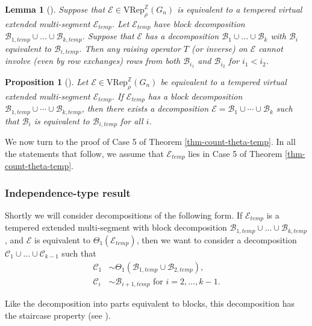 \documentclass[11pt,letterpaper]{amsart}
\newcommand{\VRep}{{\mathrm{VRep}}}
\newcommand{\BB}{\mathcal{B}}
\newcommand{\CC}{\mathcal{C}}
\newcommand{\EE}{\mathcal{E}}
\newtheorem{lemma}[thm]{Lemma}
\newtheorem{prop}[thm]{Proposition}
\numberwithin{equation}{section}
\begin{document}
\begin{lemma}[{\cite[Lemma 7.12]{HKT26}}]
\label{lem-independence-of-blocks} 
    Suppose that $\EE\in\VRep_\rho^\mathbb{Z}(G_n)$ is equivalent to a tempered virtual extended multi-segment $\EE_{temp}$. Let $\EE_{temp}$ have block decomposition $\BB_{1, temp} \cup \dots \cup \BB_{k, temp}$. Suppose that $\EE$ has a decomposition $\BB_1 \cup \dots \cup \BB_k$ with $\BB_i$ equivalent to $\BB_{i, temp}$. Then any raising operator $T$ (or inverse) on $\EE$ cannot involve (even by row exchanges) rows from both $\BB_{i_1}$ and $\BB_{i_2}$ for $i_1 < i_2$.
\end{lemma}

\begin{prop}[{\cite[Proposition 7.13]{HKT26}}]
\label{prop-independence-of-blocks} 
    Let $\EE\in\VRep_\rho^\mathbb{Z}(G_n)$ be  equivalent to a tempered virtual extended multi-segment $\EE_{temp}$. If $\EE_{temp}$ has a block decomposition $\BB_{1, temp} \cup \cdots \cup \BB_{k, temp}$, then there exists a decomposition $\EE = \BB_1 \cup \cdots \cup \BB_k$ such that $\BB_i$ is equivalent to $\BB_{i, temp}$ for all $i$.
\end{prop}


We now turn to the proof of Case 5 of Theorem \ref{thm-count-theta-temp}. In all the statements that follow, we assume that $\EE_{temp}$ lies in Case 5 of Theorem \ref{thm-count-theta-temp}.


\subsubsection{Independence-type result}

Shortly we will consider decompositions of the following form. If $\EE_{temp}$ is a tempered extended multi-segment with block decomposition $\BB_{1, temp} \cup \dots \cup \BB_{k, temp}$, and $\EE$ is equivalent to $\Theta_1(\EE_{temp})$, then we want to consider a decomposition $\CC_1 \cup \dots \cup \CC_{k-1}$ such that
\begin{align*}
    \CC_1 &\sim \Theta_1(\BB_{1, temp} \cup \BB_{2, temp}), \\
    \CC_i &\sim \BB_{i+1, temp} \text{ for } i = 2, \dots, k-1.
\end{align*}

Like the decomposition into parts equivalent to blocks, this decomposition has the staircase property (see \cite[Definition 7.5]{HKT26}).
\end{document}
